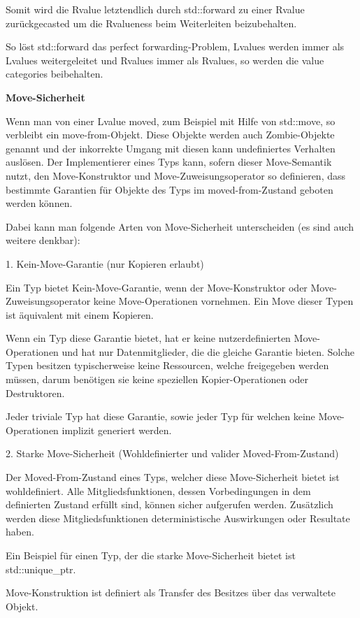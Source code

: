 \documentclass{article}
\begin{document}
Somit wird die Rvalue letztendlich durch std::forward zu einer Rvalue zurückgecasted 
um die Rvalueness beim Weiterleiten beizubehalten.

So löst std::forward das perfect forwarding-Problem, Lvalues werden immer als 
Lvalues weitergeleitet und Rvalues immer als Rvalues, so werden die value categories 
beibehalten.

\textbf{Move-Sicherheit}

Wenn man von einer Lvalue moved, zum Beispiel mit Hilfe von std::move, so verbleibt 
ein move-from-Objekt. Diese Objekte werden auch Zombie-Objekte genannt und der 
inkorrekte Umgang mit diesen kann undefiniertes Verhalten auslösen. Der Implementierer 
eines Typs kann, sofern dieser Move-Semantik nutzt, den Move-Konstruktor und Move-Zuweisungsoperator 
so definieren, dass bestimmte Garantien für Objekte des Typs im moved-from-Zustand 
geboten werden können.

Dabei kann man folgende Arten von Move-Sicherheit unterscheiden (es sind auch weitere 
denkbar):

1. Kein-Move-Garantie (nur Kopieren erlaubt)

Ein Typ bietet Kein-Move-Garantie, wenn der Move-Konstruktor oder Move-Zuweisungsoperator 
keine Move-Operationen vornehmen. Ein Move dieser Typen ist äquivalent mit einem 
Kopieren.

Wenn ein Typ diese Garantie bietet, hat er keine nutzerdefinierten Move-Operationen 
und hat nur Datenmitglieder, die die gleiche Garantie bieten. Solche Typen besitzen 
typischerweise keine Ressourcen, welche freigegeben werden müssen, darum benötigen 
sie keine speziellen Kopier-Operationen oder Destruktoren.

Jeder triviale Typ hat diese Garantie, sowie jeder Typ für welchen keine Move-Operationen 
implizit generiert werden.

\vspace{12pt}
2. Starke Move-Sicherheit (Wohldefinierter und valider Moved-From-Zustand)

Der Moved-From-Zustand eines Typs, welcher diese Move-Sicherheit bietet ist wohldefiniert. 
Alle Mitgliedsfunktionen, dessen Vorbedingungen in dem definierten Zustand erfüllt 
sind, können sicher aufgerufen werden. Zusätzlich werden diese Mitgliedsfunktionen 
deterministische Auswirkungen oder Resultate haben.

Ein Beispiel für einen Typ, der die starke Move-Sicherheit bietet ist std::unique\_ptr.

Move-Konstruktion ist definiert als Transfer des Besitzes über das verwaltete 
Objekt.
\end{document}
